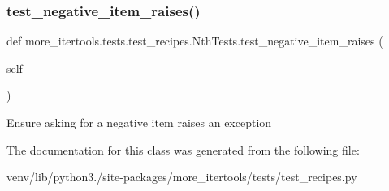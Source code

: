 \subsubsection{\texorpdfstring{test\+\_\+negative\+\_\+item\+\_\+raises()}{test\_negative\_item\_raises()}}
{\footnotesize\ttfamily def more\+\_\+itertools.\+tests.\+test\+\_\+recipes.\+Nth\+Tests.\+test\+\_\+negative\+\_\+item\+\_\+raises (\begin{DoxyParamCaption}\item[{}]{self }\end{DoxyParamCaption})}

\begin{DoxyVerb}Ensure asking for a negative item raises an exception\end{DoxyVerb}
 

The documentation for this class was generated from the following file\+:\begin{DoxyCompactItemize}
\item 
venv/lib/python3./site-\/packages/more\+\_\+itertools/tests/test\+\_\+recipes.\+py\end{DoxyCompactItemize}
